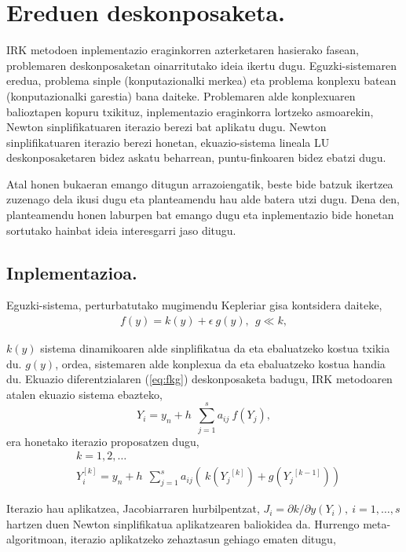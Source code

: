 \section{Ereduen deskonposaketa.}


IRK metodoen inplementazio eraginkorren azterketaren hasierako fasean, problemaren deskonposaketan oinarritutako ideia ikertu dugu. Eguzki-sistemaren eredua, problema sinple (konputazionalki merkea) eta problema konplexu batean (konputazionalki garestia) bana daiteke.   
Problemaren alde konplexuaren balioztapen kopuru txikituz, inplementazio eraginkorra lortzeko asmoarekin, Newton sinplifikatuaren iterazio berezi bat aplikatu dugu. Newton sinplifikatuaren iterazio berezi honetan, ekuazio-sistema lineala LU deskonposaketaren bidez askatu beharrean, puntu-finkoaren bidez ebatzi dugu.

Atal honen bukaeran emango ditugun arrazoiengatik, beste bide batzuk ikertzea zuzenago dela ikusi dugu eta planteamendu hau alde batera utzi dugu. Dena den, planteamendu honen laburpen bat emango dugu eta inplementazio bide honetan sortutako hainbat ideia interesgarri jaso ditugu.

\subsection*{Inplementazioa.}
Eguzki-sistema, perturbatutako mugimendu Kepleriar gisa kontsidera daiteke,  
\begin{align}
\label{eq:fkg}
 f(y)=  k(y) + \epsilon \ g (y), \ \ g\ll k,   
\end{align}
 
$k(y)$ sistema dinamikoaren alde sinplifikatua da eta ebaluatzeko kostua txikia du. $g(y)$, ordea, sistemaren alde konplexua da eta ebaluatzeko kostua handia du. Ekuazio diferentzialaren (\ref{eq:fkg}) deskonposaketa badugu, IRK metodoaren atalen ekuazio sistema ebazteko,
\begin{equation*}
Y_i=y_n+h\ \ \sum^s_{j=1}{a_{ij} \ f({Y_j}) },  
\end{equation*} 
era honetako iterazio proposatzen dugu,
\begin{align*}
&k=1,2,\dots \\
&Y_i^{[k]}=y_n+h\ \ \sum^s_{j=1}{a_{ij}(\ k({Y_j}^{[k]})+g({Y_j}^{[k-1]})) }
\end{align*}

Iterazio hau aplikatzea, Jacobiarraren hurbilpentzat, $J_i=\partial k/ \partial y (Y_i), \ i=1,\dots,s$ hartzen duen Newton sinplifikatua aplikatzearen baliokidea da. Hurrengo meta-algoritmoan, iterazio aplikatzeko zehaztasun gehiago ematen ditugu,
 
